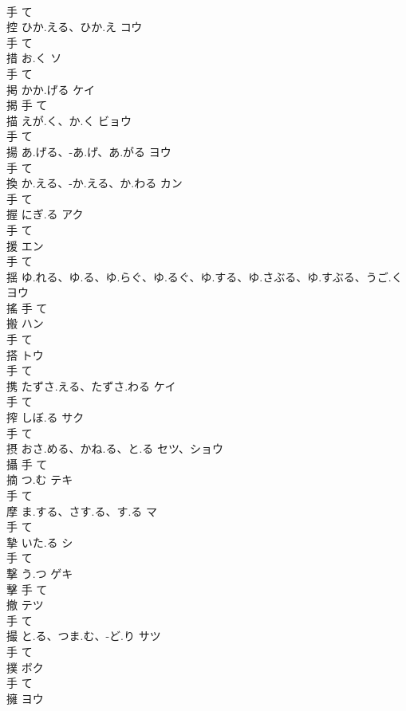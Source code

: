 \documentclass[8pt]{extreport}
\begin{document}
\begin{CJK}{UTF8}{min}
\\	手		て		
\\	控	ひか.える、ひか.え	コウ	
\\	手		て		
\\	措	お.く	ソ	
\\	手		て		
\\	掲	かか.げる	ケイ	
\\	揭	手		て		
\\	描	えが.く、か.く	ビョウ	
\\	手		て		
\\	揚	あ.げる、-あ.げ、あ.がる	ヨウ	
\\	手		て		
\\	換	か.える、-か.える、か.わる	カン	
\\	手		て		
\\	握	にぎ.る	アク	
\\	手		て		
\\	援		エン	
\\	手		て		
\\	揺	ゆ.れる、ゆ.る、ゆ.らぐ、ゆ.るぐ、ゆ.する、ゆ.さぶる、ゆ.すぶる、うご.く	ヨウ	
\\	搖	手		て		
\\	搬		ハン	
\\	手		て		
\\	搭		トウ	
\\	手		て		
\\	携	たずさ.える、たずさ.わる	ケイ	
\\	手		て		
\\	搾	しぼ.る	サク	
\\	手		て		
\\	摂	おさ.める、かね.る、と.る	セツ、ショウ	
\\	攝	手		て		
\\	摘	つ.む	テキ	
\\	手		て		
\\	摩	ま.する、さす.る、す.る	マ	
\\	手		て		
\\	摯	いた.る	シ	
\\	手		て		
\\	撃	う.つ	ゲキ	
\\	擊	手		て		
\\	撤		テツ	
\\	手		て		
\\	撮	と.る、つま.む、-ど.り	サツ	
\\	手		て		
\\	撲		ボク	
\\	手		て		
\\	擁		ヨウ	

\end{CJK}
\end{document}
